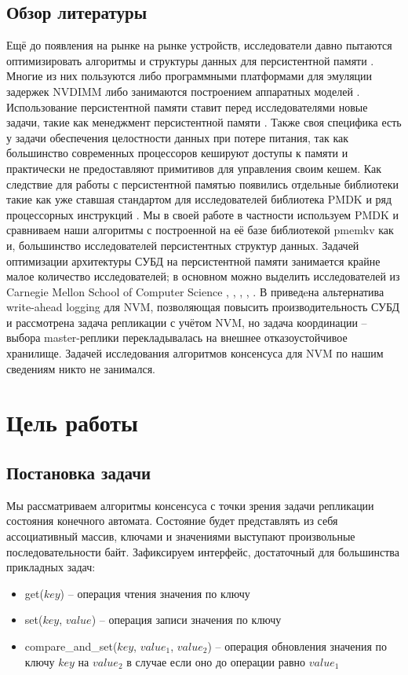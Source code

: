 \documentclass[pdftex,ptm,12pt,a4paper]{report}
\theoremstyle{definition}
\begin{document}
\section{Обзор литературы}
Ещё до появления на рынке на рынке устройств, исследователи давно пытаются оптимизировать алгоритмы \cite{iwabuchi2014nvm} и структуры данных \cite{chen2015persistent} для персистентной памяти .
Многие из них пользуются либо программными платформами для эмуляции задержек NVDIMM \cite{sengupta2015framework} либо занимаются построением аппаратных моделей \cite{dong2012nvsim}.
Использование персистентной памяти ставит перед исследователями новые задачи, такие как менеджмент персистентной памяти \cite{schwalb2015nvm}. Также своя специфика есть у задачи обеспечения
целостности данных при потере питания, так как большинство современных процессоров кешируют доступы к памяти и практически не предоставляют примитивов для управления своим кешем.
Как следствие для работы с персистентной памятью появились отдельные библиотеки такие как уже ставшая стандартом для исследователей библиотека PMDK \cite{pmdk}
и ряд процессорных инструкций \cite{kolli2016delegated}.  Мы в своей работе в частности используем PMDK и сравниваем наши алгоритмы с построенной на её базе библиотекой pmemkv 
\cite{pmemkv} как и, большинство исследователей персистентных структур данных.
Задачей оптимизации архитектуры СУБД на персистентной памяти занимается крайне малое количество исследователей; в основном можно выделить исследователей из Carnegie Mellon School of Computer Science
\cite{pavlo17}, \cite{arulraj2015let}, \cite{debrabant2014prolegomenon}, \cite{arulraj2017build}, \cite{writebehind}.  В \cite{writebehind} приведeна альтернатива write-ahead logging
для NVM, позволяющая повысить производительность СУБД и рассмотрена задача репликации с учётом NVM, но задача координации -- выбора master-реплики перекладывалась на внешнее отказоустойчивое хранилище.
Задачей исследования алгоритмов консенсуса для NVM по нашим сведениям никто не занимался.

\chapter{Цель работы}
\section{Постановка задачи}
Мы рассматриваем алгоритмы консенсуса с точки зрения задачи репликации состояния конечного автомата. Состояние будет представлять из себя ассоциативный массив, ключами и значениями
выступают произвольные последовательности байт. Зафиксируем интерфейс, достаточный для большинства прикладных задач:
\begin{itemize}
    \item get($key$) -- операция чтения значения по ключу
    \item set($key$, $value$) -- операция записи значения по ключу
    \item compare\_and\_set($key$, $value_1$, $value_2$) -- операция обновления значения по ключу $key$ на $value_2$ в случае если оно до операции равно $value_1$
\end{itemize}
\end{document}
